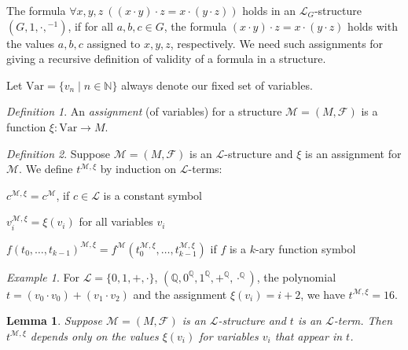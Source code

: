 \documentclass[a4paper, 11pt]{amsart}
\newtheorem{lemma}[lemma]{Lemma}
\theoremstyle{remark}
\newtheorem{definition}[definition]{Definition}
\newtheorem{example}[example]{Example}
\newcommand{\NN}{\mathbb{N}}
\newcommand{\QQ}{\mathbb{Q}}
\newcommand{\cF}{\mathcal F}
\newcommand{\cL}{\mathcal L}
\newcommand{\cM}{\mathcal M}
\newcommand{\Var}{\mathrm{Var}}
\newenvironment{enumerate-(1)}{\begin{enumerate}[label={\upshape (\arabic*)}, leftmargin=2pc]}{\end{enumerate}}
\begin{document}
The formula $\forall x,y,z\ ((x\cdot y)\cdot z = x\cdot (y\cdot z ))$ holds in an $\cL_G$-structure $(G,1,\cdot,{}^{-1})$, if for all $a,b,c\in G$, the formula $(x\cdot y)\cdot z = x\cdot (y\cdot z )$ holds with the values $a,b,c$ assigned to $x,y,z$, respectively. 
We need such assignments for giving a recursive definition of validity of a formula in a structure. 

Let $\Var=\{v_n\mid n\in \NN\}$ always denote our fixed set of variables. 

\begin{definition} 
An \emph{assignment} (of variables) for a structure $\cM=(M,\cF)$ is a function $\xi\colon \Var \rightarrow M$. 
\end{definition} 


\begin{definition} 
Suppose $\cM=(M,\cF)$ is an $\cL$-structure and $\xi$ is an assignment for $\cM$. 
We define 
 $t^{\cM,\xi}$ by induction on $\cL$-terms:  
\begin{enumerate-(1)} 
\item 
$c^{\cM,\xi}=c^{\cM}$, if $c\in \cL$ is a constant symbol  
\item 
$v_i^{\cM,\xi}=\xi(v_i)$ for all variables $v_i$ 
\item 
$f(t_0,\dots,t_{k-1})^{\cM,\xi} = f^{\cM} (t_0^{\cM,\xi},\dots,t_{k-1}^{\cM,\xi} )$ if $f$ is a $k$-ary function symbol 
\end{enumerate-(1)} 
\end{definition} 

\begin{example} 
For $\cL=\{0,1,+,\cdot\}$, $(\QQ,0^\QQ,1^\QQ,+^\QQ,\cdot^\QQ)$, the polynomial $t=(v_0\cdot v_0)+(v_1\cdot v_2)$ and the assignment $\xi(v_i)=i+2$, we have $t^{\cM,\xi}= 16$. 
\end{example} 

\begin{lemma} 
Suppose $\cM=(M,\cF)$ is an $\cL$-structure and $t$ is an $\cL$-term. 
Then $t^{\cM,\xi}$ depends only on the values $\xi(v_i)$ for variables $v_i$ that appear in $t$. 
\end{lemma}  
\end{document}
